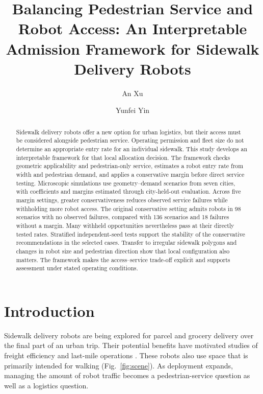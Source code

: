 \documentclass[NewProceedings,letterpaper]{ascelike-new}
\begin{document}
 
\title{Balancing Pedestrian Service and Robot Access: An Interpretable Admission Framework for Sidewalk Delivery Robots}
\author[1]{An Xu}
\author[1,*]{Yunfei Yin}
\maketitle
\begingroup
\renewcommand{\thefootnote}{*}
\endgroup
\begin{abstract}
Sidewalk delivery robots offer a new option for urban logistics, but their access must be considered alongside pedestrian service. Operating permission and fleet size do not determine an appropriate entry rate for an individual sidewalk. This study develops an interpretable framework for that local allocation decision. The framework checks geometric applicability and pedestrian-only service, estimates a robot entry rate from width and pedestrian demand, and applies a conservative margin before direct service testing. Microscopic simulations use geometry--demand scenarios from seven cities, with coefficients and margins estimated through city-held-out evaluation. Across five margin settings, greater conservativeness reduces observed service failures while withholding more robot access. The original conservative setting admits robots in 98 scenarios with no observed failures, compared with 136 scenarios and 18 failures without a margin. Many withheld opportunities nevertheless pass at their directly tested rates. Stratified independent-seed tests support the stability of the conservative recommendations in the selected cases. Transfer to irregular sidewalk polygons and changes in robot size and pedestrian direction show that local configuration also matters. The framework makes the access--service trade-off explicit and supports assessment under stated operating conditions.
\end{abstract}

\section{Introduction}
Sidewalk delivery robots are being explored for parcel and grocery delivery over the final part of an urban trip. Their potential benefits have motivated studies of freight efficiency and last-mile operations \cite{Jennings2019,Alverhed2024}. These robots also use space that is primarily intended for walking (Fig.~\ref{fig:scene}). As deployment expands, managing the amount of robot traffic becomes a pedestrian-service question as well as a logistics question.
\end{document}

